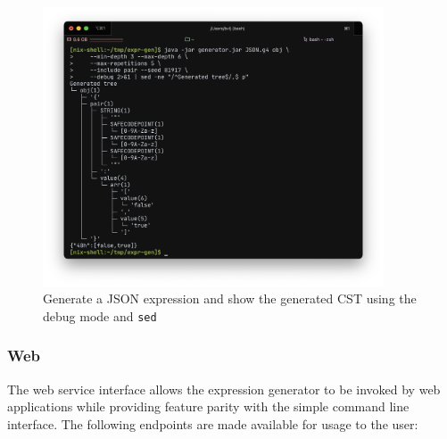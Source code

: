 \documentclass[]{usiinfbachelorproject}
\begin{document}
\begin{figure}[ht]
\centering
\includegraphics[width=0.9\textwidth]{img/ui_cli_pipe.png}
\caption{Generate a JSON expression and show the generated CST using the debug mode and \texttt{sed}}
\label{user-usage-cli-shot}
\end{figure}

\subsubsection{Web}\label{user-usage-web}


The web service interface allows the expression generator to be
invoked by web applications while providing feature parity with the
simple command line interface. The following endpoints are made available for
usage to the user:

\vspace{1em}
\end{document}
